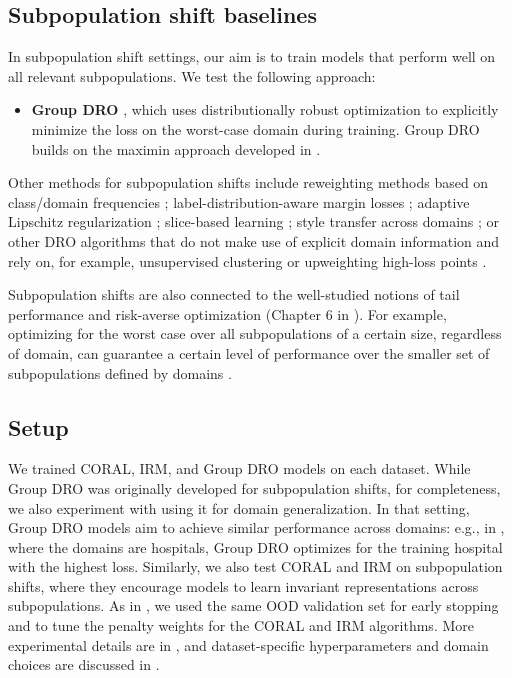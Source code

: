 \subsection{Subpopulation shift baselines}
In subpopulation shift settings, our aim is to train models that perform well on all relevant subpopulations. We test the following approach:
\begin{itemize}
  \item \textbf{Group DRO} \citep{hu2018does,sagawa2020group}, which uses distributionally robust optimization to explicitly minimize the loss on the worst-case domain during training. Group DRO builds on the maximin approach developed in \citet{meinshausen2015maximin}.
\end{itemize}
Other methods for subpopulation shifts include
reweighting methods based on class/domain frequencies \citep{shimodaira2000improving,cui2019class};
label-distribution-aware margin losses \citep{cao2019learning};
adaptive Lipschitz regularization \citep{cao2020heteroskedastic};
slice-based learning \citep{chen2019slice,re2019overton};
style transfer across domains \citep{goel2020model};
or other DRO algorithms that do not make use of explicit domain information and
rely on, for example, unsupervised clustering \citep{oren2019drolm,sohoni2020subclass}
or upweighting high-loss points \citep{nam2020learning,liu2021jtt}.

Subpopulation shifts are also connected to the well-studied notions of tail performance and risk-averse optimization (Chapter 6 in \citet{shapiro2014lectures}).
For example, optimizing for the worst case over all subpopulations of a certain size, regardless of domain, can guarantee a certain level of performance over the smaller set of subpopulations defined by domains \citep{duchi2019distributionally,duchi2021learning}.

\subsection{Setup}
We trained CORAL, IRM, and Group DRO models on each dataset.
While Group DRO was originally developed for subpopulation shifts, for completeness, we also experiment with using it for domain generalization. In that setting, Group DRO models aim to achieve similar performance across domains: e.g., in \Camelyon, where the domains are hospitals, Group DRO optimizes for the training hospital with the highest loss.
Similarly, we also test CORAL and IRM on subpopulation shifts, where they encourage models to learn invariant representations across subpopulations.
As in , we used the same OOD validation set for early stopping and to tune the penalty weights for the CORAL and IRM algorithms.
More experimental details are in , and dataset-specific hyperparameters and domain choices are discussed in .


